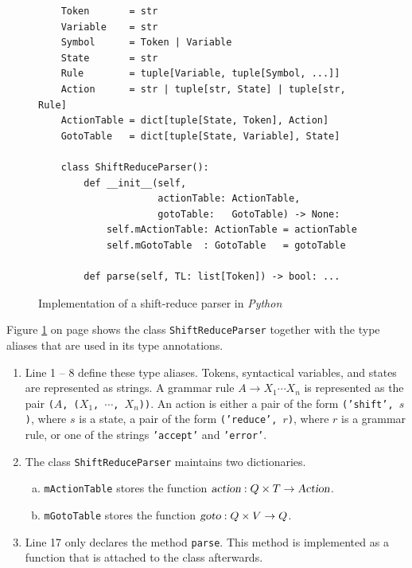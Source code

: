 \begin{figure}[!ht]
\centering
\begin{verbatim}
    Token       = str
    Variable    = str
    Symbol      = Token | Variable
    State       = str
    Rule        = tuple[Variable, tuple[Symbol, ...]]
    Action      = str | tuple[str, State] | tuple[str, Rule]
    ActionTable = dict[tuple[State, Token], Action]
    GotoTable   = dict[tuple[State, Variable], State]

    class ShiftReduceParser():
        def __init__(self,
                     actionTable: ActionTable,
                     gotoTable:   GotoTable) -> None:
            self.mActionTable: ActionTable = actionTable
            self.mGotoTable  : GotoTable   = gotoTable

        def parse(self, TL: list[Token]) -> bool: ...
\end{verbatim}
\vspace*{-0.3cm}
\caption{Implementation of a shift-reduce parser in \textsl{Python}}
\label{fig:01-Shift-Reduce-Parser-Pure.ipynb}
\end{figure}

\noindent
Figure \ref{fig:01-Shift-Reduce-Parser-Pure.ipynb} on page \pageref{fig:01-Shift-Reduce-Parser-Pure.ipynb} shows the class
\texttt{ShiftReduceParser} together with the type aliases that are used in its type annotations.
\begin{enumerate}
\item Line 1 -- 8 define these type aliases.  Tokens, syntactical variables, and states are represented as
      strings.  A grammar rule $A \rightarrow X_1 \cdots X_n$ is represented as the pair
      \texttt{($A$, ($X_1$, $\cdots$, $X_n$))}.  An action is either a pair of the form \texttt{('shift', $s$)},
      where $s$ is a state, a pair of the form \texttt{('reduce', $r$)}, where $r$ is a grammar rule, or one of
      the strings \texttt{'accept'} and \texttt{'error'}.
\item The class \texttt{ShiftReduceParser} maintains two dictionaries.
      \begin{enumerate}[(a)]
      \item \texttt{mActionTable} stores the function $\textsl{action}: Q \times T \rightarrow \textsl{Action}$.
      \item \texttt{mGotoTable} stores the function $\textsl{goto}: Q \times V \rightarrow Q$.
      \end{enumerate}
\item Line 17 only declares the method \texttt{parse}.  This method is implemented as a function that is 
      attached to the class afterwards.
\end{enumerate}

